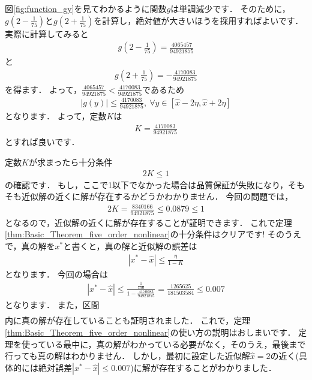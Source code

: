 図\ref{fig:function_gy}を見てわかるように関数$g$は単調減少です．
そのために，$g\left(2-\frac{1}{75} \right)$と$g\left(2 + \frac{1}{75} \right)$を計算し，絶対値が大きいほうを採用すればよいです．
実際に計算してみると
\begin{align*}
	g\left(2-\frac{1}{75} \right) = \frac{4065457}{94921875}
\end{align*}	
と
\begin{align*}
	g\left(2 + \frac{1}{75} \right) = -\frac{4170083}{94921875}
\end{align*}
を得ます．
よって，$ \frac{4065457}{94921875} < \frac{4170083}{94921875}$であるため
\begin{align*}
	 | g(y) | \le \frac{4170083}{94921875}, ~ \forall y \in [\hat{x} -2 \eta, \hat{x} + 2 \eta]
\end{align*}	
となります．
よって，定数$K$は
\begin{align*}
	K = \frac{4170083}{94921875}
\end{align*}	
とすれば良いです．


定数$K$が求まったら十分条件
\begin{align*}
	2 K \le 1
\end{align*}
の確認です．
もし，ここで1以下でなかった場合は品質保証が失敗になり，そもそも近似解の近くに解が存在するかどうかわかりません．
今回の問題では，
\begin{align*}
	2 K = \frac{8340166}{94921875} \le 0.0879 \le 1
\end{align*}
となるので，近似解の近くに解が存在することが証明できます．
これで定理\ref{thm:Basic_Theorem_five_order_nonlinear}の十分条件はクリアです!
そのうえで，真の解を$x^*$と書くと，真の解と近似解の誤差は
\begin{align*}
	| x^* - \hat{x}  | \le \frac{\eta}{ 1 - K }
\end{align*}
となります．
今回の場合は
\begin{align*}
	| x^* - \hat{x}  | \le \frac{ \frac{1}{150} }{ 1 - \frac{4170083}{94921875} } = \frac{1265625}{181503584} \le 0.007
\end{align*}
となります．
また，区間
\begin{align*}
	[ 1.993, 2.007 ]
\end{align*}
内に真の解が存在していることも証明されました．
これで，定理\ref{thm:Basic_Theorem_five_order_nonlinear}の使い方の説明はおしまいです．
定理を使っている最中に，真の解がわかっている必要がなく，そのうえ，最後まで行っても真の解はわかりません．
しかし，最初に設定した近似解$\hat{x}=2$の近く(具体的には絶対誤差$| x^* - \hat{x}  | \le 0.007$)に解が存在することがわかりました．

